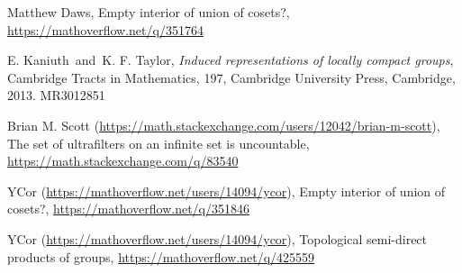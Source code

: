\documentclass[twoside,a4paper,12pt]{article}
\theoremstyle{plain}
\theoremstyle{definition}
\begin{document}
\begin{thebibliography}{aa}

 Matthew Daws, Empty interior of union of cosets?, 
   \url{https://mathoverflow.net/q/351764}

 E. Kaniuth\ and\ K. F. Taylor, {\it Induced representations of locally compact groups}, Cambridge Tracts in Mathematics, 197, Cambridge University Press, Cambridge, 2013. MR3012851

 Brian M. Scott (\url{https://math.stackexchange.com/users/12042/brian-m-scott}), The set of ultrafilters on an infinite set is uncountable, \url{https://math.stackexchange.com/q/83540}

 YCor (\url{https://mathoverflow.net/users/14094/ycor}), Empty interior of union of cosets?,
   \url{https://mathoverflow.net/q/351846}

 YCor (\url{https://mathoverflow.net/users/14094/ycor}), Topological semi-direct products of groups,
   \url{https://mathoverflow.net/q/425559}

\end{thebibliography}
\end{document}
